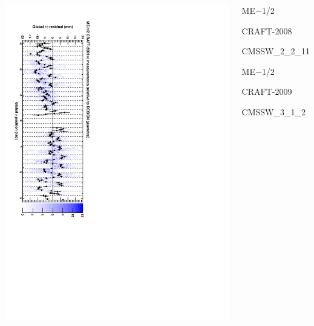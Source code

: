 \documentclass[compress]{beamer}
\begin{document}
\begin{frame}
\begin{columns}
\includegraphics[height=\linewidth, angle=90]{alternation_2009_mem12_design.pdf}
\begin{center}
ME$-$1/2

CRAFT-2008

CMSSW\_2\_2\_11

\vspace{1.5 cm}
ME$-$1/2

CRAFT-2009

CMSSW\_3\_1\_2

\vspace{0.5 cm}
\mbox{ }
\end{center}
\end{columns}
\end{frame}
\end{document}
